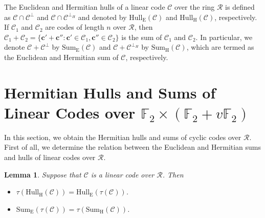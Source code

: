\documentclass[pdflatex,sn-mathphys-num]{sn-jnl}%
\theoremstyle{thmstyleone}%
\newtheorem{lemma}[theorem]{Lemma}
\theoremstyle{thmstyletwo}%
\theoremstyle{thmstylethree}%
\begin{document}
The Euclidean and Hermitian hulls of a linear code $\mathcal{C}$ over the ring $\mathcal{R}$ is defined as $\mathcal{C} \cap \mathcal{C}^{\perp}$ and $\mathcal{C} \cap \mathcal{C}^{\perp_H}$ and denoted by $\mathrm{Hull_E}(\mathcal{C})$ and $\mathrm{Hull_H}(\mathcal{C})$, respectively. If $\mathcal{C}_1$ and $\mathcal{C}_2$ are codes of length $n$ over $\mathcal{R}$, then $\mathcal{C}_1+\mathcal{C}_2= \{ \mathbf{c'} +
\mathbf{c''} : \mathbf{c'}\in \mathcal{C}_1,
\mathbf{c''} \in \mathcal{C}_2 \}$  is the sum of $\mathcal{C}_1$ and $\mathcal{C}_2$. In particular, we denote $\mathcal{C}+\mathcal{C}^{\perp}$ by $\mathrm{Sum_E}(\mathcal{C})$ and $\mathcal{C}+\mathcal{C}^{\perp_H}$ by $\mathrm{Sum_H}(\mathcal{C})$, which are termed as the Euclidean and Hermitian sum of $\mathcal{C}$, respectively.


\section{Hermitian Hulls and Sums of Linear Codes over $\mathbb{F}_2 \times (\mathbb{F}_2+v\mathbb{F}_2)$}
\label{sec3}
In this section, we obtain the Hermitian hulls and sums of cyclic codes over $\mathcal{R}$. First of all, we determine the relation between the Euclidean and Hermitian sums and hulls of linear codes over $\mathcal{R}$.

\begin{lemma}\label{l2}
Suppose that $\mathcal{C}$ is a linear code over $\mathcal{R}$. Then
\begin{itemize}
    \item[(i)] $\tau(\mathrm{Hull_H}(\mathcal{C}))=\mathrm{Hull_E}(\tau(\mathcal{C}))$.
    \item[(ii)] $\mathrm{Sum_E}(\tau(\mathcal{C}))=\tau(\mathrm{Sum_H}(\mathcal{C}))$.
\end{itemize}
\end{lemma}
\end{document}
